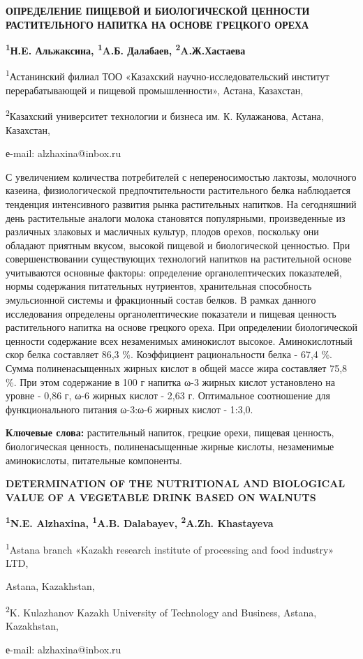 \begin{center}
{\large\bfseries ОПРЕДЕЛЕНИЕ ПИЩЕВОЙ И БИОЛОГИЧЕСКОЙ ЦЕННОСТИ РАСТИТЕЛЬНОГО
НАПИТКА НА ОСНОВЕ ГРЕЦКОГО ОРЕХА}

{\bfseries \textsuperscript{1}Н.E. Альжаксина\envelope, \textsuperscript{1}A.Б. Далабаев, \textsuperscript{2}A.Ж.Хастаева}

\textsuperscript{1}Астанинский филиал ТОО «Казахский
научно-исследовательский институт перерабатывающей и пищевой
промышленности», Астана, Казахстан,

\textsuperscript{2}Казахский университет технологии и бизнеса им. К.
Кулажанова, Астана, Казахстан,

е-mail: alzhaxina@inbox.ru
\end{center}

С увеличением количества потребителей с непереносимостью лактозы,
молочного казеина, физиологической предпочтительности растительного
белка наблюдается тенденция интенсивного развития рынка растительных
напитков. На сегодняшний день растительные аналоги молока становятся
популярными, произведенные из различных злаковых и масличных культур,
плодов орехов, поскольку они обладают приятным вкусом, высокой пищевой и
биологической ценностью. При совершенствовании существующих технологий
напитков на растительной основе учитываются основные факторы:
определение органолептических показателей, нормы содержания питательных
нутриентов, хранительная способность эмульсионной системы и фракционный
состав белков. В рамках данного исследования определены
органолептические показатели и пищевая ценность растительного напитка на
основе грецкого ореха. При определении биологической ценности содержание
всех незаменимых аминокислот высокое. Аминокислотный скор белка
составляет 86,3 \%. Коэффициент рациональности белка - 67,4 \%. Сумма
полиненасыщенных жирных кислот в общей массе жира составляет 75,8 \%.
При этом содержание в 100 г напитка ω-3 жирных кислот установлено на
уровне - 0,86 г, ω-6 жирных кислот - 2,63 г. Оптимальное соотношение для
функционального питания ω-3:ω-6 жирных кислот - 1:3,0.

{\bfseries Ключевые слова:} растительный напиток, грецкие орехи, пищевая
ценность, биологическая ценность, полиненасыщенные жирные кислоты,
незаменимые аминокислоты, питательные компоненты.

\begin{center}
{\large\bfseries DETERMINATION OF THE NUTRITIONAL AND BIOLOGICAL VALUE OF A VEGETABLE DRINK BASED ON WALNUTS}

{\bfseries \textsuperscript{1}N.E. Alzhaxina\envelope, \textsuperscript{1}A.B. Dalabayev, \textsuperscript{2}A.Zh. Khastayeva}

\textsuperscript{1}Astana branch «Kazakh research institute of
processing and food industry» LTD,

Astana, Kazakhstan,

\textsuperscript{2}K. Kulazhanov Kazakh University of Technology and
Business, Astana, Kazakhstan,

е-mail: alzhaxina@inbox.ru
\end{center}


